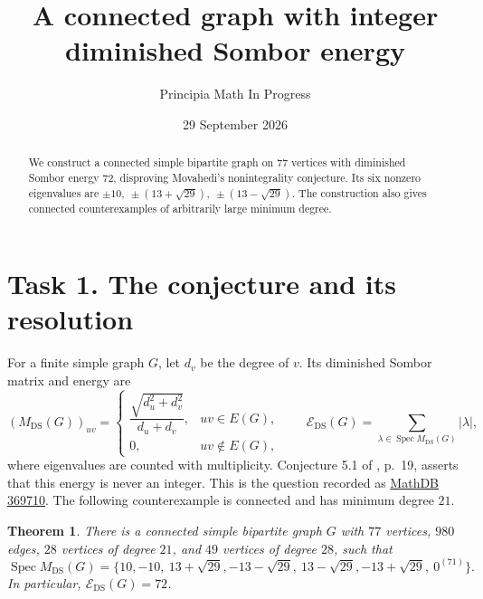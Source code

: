 \documentclass[11pt]{article}
\title{A connected graph with integer diminished Sombor energy}
\author{Principia Math In Progress}
\date{29 September 2026}
\newtheorem{theorem}{Theorem}
\newcommand{\DS}{\mathrm{DS}}
\newcommand{\E}{\mathcal E_{\DS}}
\begin{document}
\maketitle
\begin{abstract}
We construct a connected simple bipartite graph on \(77\) vertices with
diminished Sombor energy \(72\), disproving Movahedi's nonintegrality
conjecture. Its six nonzero eigenvalues are
\(\pm10,\ \pm(13+\sqrt{29}),\ \pm(13-\sqrt{29})\).
The construction also gives connected counterexamples of arbitrarily
large minimum degree.
\end{abstract}

\section*{Task 1. The conjecture and its resolution}
For a finite simple graph \(G\), let \(d_v\) be the degree of \(v\). Its
diminished Sombor matrix and energy are
\[
 (M_{\DS}(G))_{uv}=
 \begin{cases}
 \dfrac{\sqrt{d_u^2+d_v^2}}{d_u+d_v},&uv\in E(G),\\
 0,&uv\notin E(G),
 \end{cases}
 \qquad
 \E(G)=\sum_{\lambda\in\operatorname{Spec}M_{\DS}(G)}|\lambda|,
\]
where eigenvalues are counted with multiplicity. Conjecture 5.1 of
\cite{movahedi}, p.~19, asserts that this energy is never an integer.
This is the question recorded as
\href{https://mathdb.com/p/369710}{MathDB 369710}.
The following counterexample is connected and has minimum degree \(21\).

\begin{theorem}\label{thm:main}
There is a connected simple bipartite graph \(G\) with \(77\) vertices,
\(980\) edges, \(28\) vertices of degree \(21\), and \(49\) vertices of
degree \(28\), such that
\[
 \operatorname{Spec}M_{\DS}(G)
 =\{10,-10,\ 13+\sqrt{29},-13-\sqrt{29},\
       13-\sqrt{29},-13+\sqrt{29},\ 0^{(71)}\}.
\]
In particular, \(\E(G)=72\).
\end{theorem}
\end{document}
